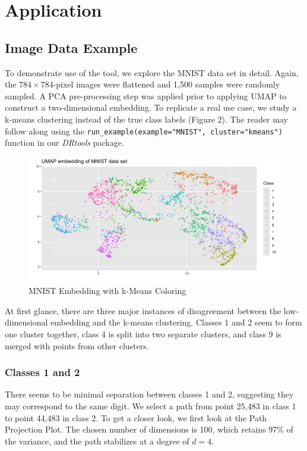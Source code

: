 \documentclass{article}
\begin{document}
{\section{Application}

\subsection{Image Data Example}
To demonstrate use of the tool, we explore the MNIST data set in detail. Again, the $784 \times 784$-pixel images were flattened and 1,500 samples were randomly sampled. A PCA pre-processing step was applied prior to applying UMAP \cite{UMAP} to construct a two-dimensional embedding. To replicate a real use case, we study a k-means clustering instead of the true class labels (Figure 2). The reader may follow along using the \texttt{run\_example(example="MNIST", cluster="kmeans")} function in our \textit{DRtools} package.

\renewcommand{\figurename}{Figure}
\renewcommand{\thefigure}{2}
\begin{figure}[!t]
\centering
\includegraphics[scale=0.43]{MNIST kmeans}
\caption{MNIST Embedding with k-Means Coloring}
\end{figure}

At first glance, there are three major instances of disagreement between the low-dimensional embedding and the k-means clustering. Classes 1 and 2 seem to form one cluster together, class 4 is split into two separate clusters, and class 9 is merged with points from other clusters.

\subsubsection{Classes 1 and 2}
There seems to be minimal separation between classes 1 and 2, suggesting they may correspond to the same digit. We select a path from point 25,483 in class 1 to point 44,483 in class 2. To get a closer look, we first look at the Path Projection Plot. The chosen number of dimensions is 100, which retains 97\% of the variance, and the path stabilizes at a degree of $d = 4$.

}
\end{document}
